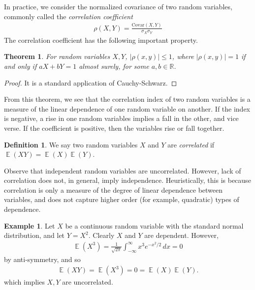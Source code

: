 \documentclass[12pt]{article}
\newcommand{\rr}{\mathbb{R}}
\DeclareMathOperator{\ex}{\mathbb{E}}
\newcommand{\covar}{\mathrm{Covar}}
\theoremstyle{plain}
\newtheorem{theorem}{Theorem}
\theoremstyle{definition}
\newtheorem*{definition}{Definition}
\newtheorem*{example}{Example}
\theoremstyle{remark}
\numberwithin{equation}{section}  %
\begin{document}
In practice, we consider the normalized covariance of two random variables,
commonly called the \emph{correlation coefficient}
\begin{align*}
	\rho(X,Y) = \frac{\covar(X,Y)}{\sigma_X \sigma_Y}
\end{align*}
The correlation coefficient has the following important property.
\begin{theorem}
	For random variables $X, Y$, $|\rho(x,y)| \le 1$, where $|\rho(x,y)| = 1$ 
	if and
	only if $aX + bY = 1$ almost surely, for some $a,b \in \rr$. 
\end{theorem}
\begin{proof}
	It is a standard application of Cauchy-Schwarz.
\end{proof}
From this theorem, we see that the correlation index of two random variables is
a measure of the linear dependence of one random variable on another. If the
index is negative, a rise in one random variables implies a fall in the other,
and vice verse. If the coefficient is positive, then the variables rise or fall
together.
\begin{definition}
	We say two random variables $X$ and $Y$ are \emph{correlated} 
	if $\ex(XY) = \ex(X)\ex(Y)$.
\end{definition}
Observe that independent random variables are uncorrelated. However,
lack of correlation does not, in general, imply independence. Heuristically, 
this is
because correlation is only a measure of the degree of linear dependence
between variables, and does not capture higher order (for example, quadratic)
types of dependence. 
\begin{example}
	Let $X$ be a continuous random variable with the standard normal 
	distribution,
	and let $Y = X^2$. Clearly $X$ and $Y$ are dependent. However,
	\begin{align*}
		\ex(X^3) = \frac{1}{\sqrt{2 \pi}}\int_{-\infty}^{\infty} x^3 e^{-x^2/2} 
		\, dx = 0
	\end{align*}
	by anti-symmetry, and so
	\begin{align*}
		\ex(XY) = \ex(X^3) = 0 = \ex(X) \ex(Y).
	\end{align*}
	which implies $X, Y$ are uncorrelated.
\end{example}
\end{document}
